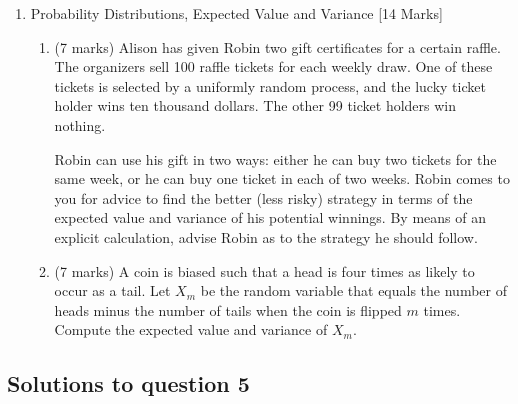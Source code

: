\documentclass{article}
\begin{document}
\begin{enumerate}
    \item Probability Distributions, Expected Value and Variance [14 Marks]
          \begin{enumerate}
              \item (7 marks) Alison has given Robin two gift certificates for a certain raffle. The organizers sell 100 raffle tickets for each weekly draw. One of these tickets is selected by a uniformly random process, and the lucky ticket holder wins ten thousand dollars. The other 99 ticket holders win nothing.

                    Robin can use his gift in two ways: either he can buy two tickets for the same week, or he can buy one ticket in each of two weeks. Robin comes to you for advice to find the better (less risky) strategy in terms of the expected value and variance of his potential winnings. By means of an explicit calculation, advise Robin as to the strategy he should follow.

              \item (7 marks) A coin is biased such that a head is four times as likely to occur as a tail. Let \( X_m \) be the random variable that equals the number of heads minus the number of tails when the coin is flipped \( m \) times. Compute the expected value and variance of \( X_m \).
          \end{enumerate}
\end{enumerate}


\subsection*{Solutions to question 5}
\end{document}

